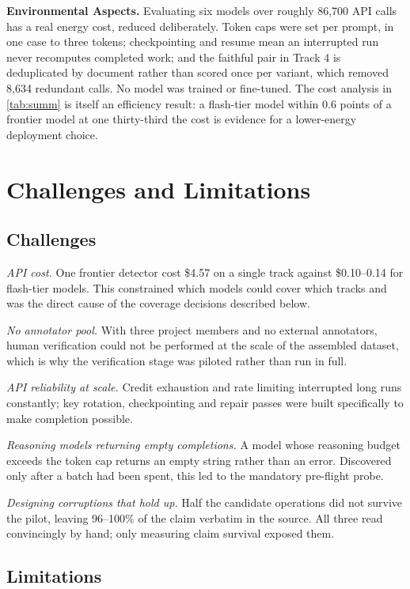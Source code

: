 \documentclass{iutbscthesis}
\begin{document}
\textbf{Environmental Aspects.} Evaluating six models over roughly 86,700 API calls has a real energy cost, reduced deliberately. Token caps were set per prompt, in one case to three tokens; checkpointing and resume mean an interrupted run never recomputes completed work; and the faithful pair in Track 4 is deduplicated by document rather than scored once per variant, which removed 8,634 redundant calls. No model was trained or fine-tuned. The cost analysis in \autoref{tab:summ} is itself an efficiency result: a flash-tier model within 0.6 points of a frontier model at one thirty-third the cost is evidence for a lower-energy deployment choice.

\chapter{Challenges and Limitations} \label{chapter:challenges}

\section{Challenges}

\emph{API cost.} One frontier detector cost \$4.57 on a single track against \$0.10--0.14 for flash-tier models. This constrained which models could cover which tracks and was the direct cause of the coverage decisions described below.

\emph{No annotator pool.} With three project members and no external annotators, human verification could not be performed at the scale of the assembled dataset, which is why the verification stage was piloted rather than run in full.

\emph{API reliability at scale.} Credit exhaustion and rate limiting interrupted long runs constantly; key rotation, checkpointing and repair passes were built specifically to make completion possible.

\emph{Reasoning models returning empty completions.} A model whose reasoning budget exceeds the token cap returns an empty string rather than an error. Discovered only after a batch had been spent, this led to the mandatory pre-flight probe.

\emph{Designing corruptions that hold up.} Half the candidate operations did not survive the pilot, leaving 96--100\% of the claim verbatim in the source. All three read convincingly by hand; only measuring claim survival exposed them.

\section{Limitations}
\end{document}
